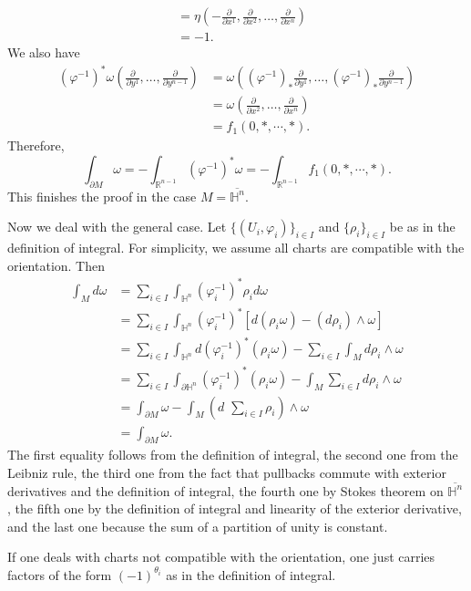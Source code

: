 \documentclass{ximera}
\begin{document}
\begin{solution}
\begin{align*}
     & = \eta ( - \tfrac{\partial }{\partial x ^{1}} , \tfrac{\partial }{\partial x ^{2}} ,  \ldots , \tfrac{\partial }{\partial x ^{n}}  )\\
     & = -1 .
    \end{align*}
    We also have 
    \begin{align*}
     ( \varphi ^{-1}) ^{\ast} \omega ( \tfrac{\partial}{\partial y^1} , \ldots ,  \tfrac{\partial}{\partial y^{n-1}} )  & =  \omega (  ( \varphi ^{-1} ) _{\ast} \tfrac{\partial }{\partial y ^1} , \ldots ,  ( \varphi ^{-1} ) _{\ast} \tfrac{\partial }{\partial y ^{n-1}}   )  \\
     & = \omega ( \tfrac{\partial }{\partial x ^{2}} ,  \ldots , \tfrac{\partial }{\partial x ^{n}}  )\\
     & = f_1 (0, \ast , \cdots , \ast).
    \end{align*}
    Therefore, 
    \[     \int_{\partial M} \omega = -\int_{\mathbb{R}^{n-1}}   ( \varphi ^{-1}) ^{\ast} \omega  = -  \int_{\mathbb{R}^{n-1}} f_1   (0, \ast , \cdots , \ast) .            \]
    This finishes the proof in the case $M = \overline{\mathbb{H}^n}$.
\end{solution}

\begin{solution}
    Now we deal with the general case. Let $\{ (U_i, \varphi_i )\} _{i \in I}$ and $\{ \rho _i \} _{i \in I}$ be as in the definition of integral. For simplicity, we assume all charts are compatible with the orientation. Then 
    \begin{align*}
        \int_M d \omega & = \sum _{i \in I} \int _{\mathbb{H}^n} (\varphi _i ^{-1} ) ^{\ast} \rho_i d \omega \\
        & = \sum _{i \in I} \int _{\mathbb{H}^n} (\varphi _i ^{-1} ) ^{\ast} [d ( \rho _i  \omega ) - (d \rho _i) \wedge \omega ] \\
        & = \sum _{i \in I} \int _{\mathbb{H}^n} d (\varphi _i ^{-1} ) ^{\ast}  ( \rho _i  \omega )  - \sum _{i \in I} \int_M d \rho _i  \wedge \omega \\
        & = \sum _{i \in I} \int_{\partial \mathbb{H}^n} (\varphi _i ^{-1} ) ^{\ast}  ( \rho _i  \omega )  - \int_M \sum _{i \in I} d \rho _i \wedge \omega \\
        & = \int_{\partial M } \omega   - \int_M \left( d \,\,  \sum _{i \in I}  \rho _i \right) \wedge \omega \\
        & = \int_{\partial M } \omega .
    \end{align*}
The first equality follows from the definition of integral, the second one from the Leibniz rule, the third one from the fact that pullbacks commute with exterior derivatives and the definition of integral, the fourth one by Stokes theorem on $\overline{\mathbb{H}^n}$, the fifth one by the definition of integral and linearity of the exterior derivative, and the last one because the sum of a partition of unity is constant.

If one deals with charts not compatible with the orientation, one just carries factors of the form $(-1) ^{\theta _i }$ as in the definition of integral.
\end{solution}
\end{document}
